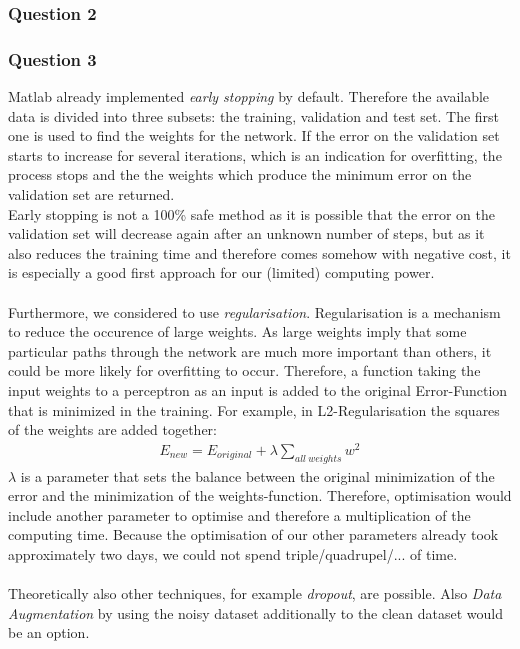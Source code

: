 \documentclass{article}
\begin{document}
\subsubsection{Question 2}

\subsubsection{Question 3}
Matlab already implemented \emph{early stopping} by default. Therefore the available data is divided into three subsets: the training, validation and test set. The first one is used to find the weights for the network. If the error on the validation set starts to increase for several iterations, which is an indication for overfitting, the process stops and the the weights which produce the minimum error on the validation set are returned.\\
Early stopping is not a 100\% safe method as it is possible that the error on the validation set will decrease again after an unknown number of steps, but as it also reduces the training time and therefore comes somehow with negative cost, it is especially a good first approach for our (limited) computing power.\\
\\
Furthermore, we considered to use \emph{regularisation}. Regularisation is a mechanism to reduce the occurence of large weights. As large weights imply that some particular paths through the network are much more important than others, it could be more likely for overfitting to occur. Therefore, a function taking the input weights to a perceptron as an input is added to the original Error-Function that is minimized in the training. For example, in L2-Regularisation the squares of the weights are added together:
\begin{align*}
    E_{new} = E_{original} + \lambda \sum \limits_{all\ weights} w^2
\end{align*}
$\lambda$ is a parameter that sets the balance between the original minimization of the error and the minimization of the weights-function. Therefore, optimisation would include another parameter to optimise and therefore a multiplication of the computing time. Because the optimisation of our other parameters already took approximately two days, we could not spend triple/quadrupel/... of time. \\
\\
Theoretically also other techniques, for example \emph{dropout}, are possible. Also \emph{Data Augmentation} by using the noisy dataset additionally to the clean dataset would be an option.\\
\end{document}

